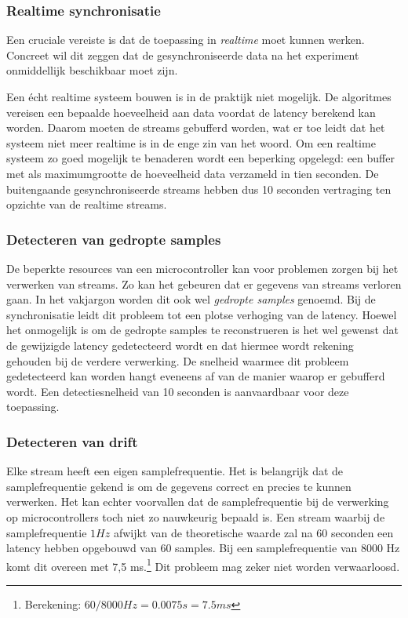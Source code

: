 \subsubsection{Realtime synchronisatie}

Een cruciale vereiste is dat de toepassing in \textit{realtime} moet kunnen werken. Concreet wil dit zeggen dat de gesynchroniseerde data na het experiment onmiddellijk beschikbaar moet zijn.

Een écht realtime systeem bouwen is in de praktijk niet mogelijk. De algoritmes vereisen een bepaalde hoeveelheid aan data voordat de latency berekend kan worden. Daarom moeten de streams gebufferd worden, wat er toe leidt dat het systeem niet meer realtime is in de enge zin van het woord. Om een realtime systeem zo goed mogelijk te benaderen wordt een beperking opgelegd: een buffer met als maximumgrootte de hoeveelheid data verzameld in tien seconden. De buitengaande gesynchroniseerde streams hebben dus 10 seconden vertraging ten opzichte van de realtime streams.

\subsubsection{Detecteren van gedropte samples}

De beperkte resources van een microcontroller kan voor problemen zorgen bij het verwerken van streams. Zo kan het gebeuren dat er gegevens van streams verloren gaan. In het vakjargon worden dit ook wel \textit{gedropte samples} genoemd. Bij de synchronisatie leidt dit probleem tot een plotse verhoging van de latency. Hoewel het onmogelijk is om de gedropte samples te reconstrueren is het wel gewenst dat de gewijzigde latency gedetecteerd wordt en dat hiermee wordt rekening gehouden bij de verdere verwerking. De snelheid waarmee dit probleem gedetecteerd kan worden hangt eveneens af van de manier waarop er gebufferd wordt. Een detectiesnelheid van 10 seconden is aanvaardbaar voor deze toepassing.

\subsubsection{Detecteren van drift}

Elke stream heeft een eigen samplefrequentie. Het is belangrijk dat de samplefrequentie gekend is om de gegevens correct en precies te kunnen verwerken. Het kan echter voorvallen dat de samplefrequentie bij de verwerking op microcontrollers toch niet zo nauwkeurig bepaald is. Een stream waarbij de samplefrequentie $ 1Hz $ afwijkt van de theoretische waarde zal na 60 seconden een latency hebben opgebouwd van 60 samples. Bij een samplefrequentie van 8000 Hz komt dit overeen met 7,5 ms.\footnote{Berekening: $ 60 / 8000 Hz = 0.0075 s = 7.5 ms $} Dit probleem mag zeker niet worden verwaarloosd. 

